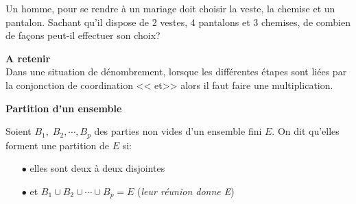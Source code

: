  \begin{exercice}
Un homme, pour se rendre à un mariage doit choisir la veste,  la chemise  et un pantalon. Sachant qu'il dispose de 2 vestes, 4 pantalons et 3 chemises, de combien de façons peut-il effectuer son choix? 
   \end{exercice}
 
\textbf{A retenir}\\
 Dans une situation de dénombrement, lorsque les différentes étapes sont liées par la conjonction de coordination  << et>>   alors il faut faire une multiplication.

\textbf{Partition d'un ensemble}
\begin{definition}
Soient $ B_{1}, \; B_{2}, \cdots, B_{p} $ des  parties non vides d'un ensemble fini $ E. $  On dit qu'elles forment une partition de $ E $ si:
\begin{itemize}
\item[$  \bullet$] elles sont deux à deux disjointes 
\item[$  \bullet$]  et  $B_{1}\cup B_{2}\cup  \cdots\cup B_{p} =E $\; (\textit{leur réunion donne E})
\end{itemize}
\end{definition}

\bigskip
{}

